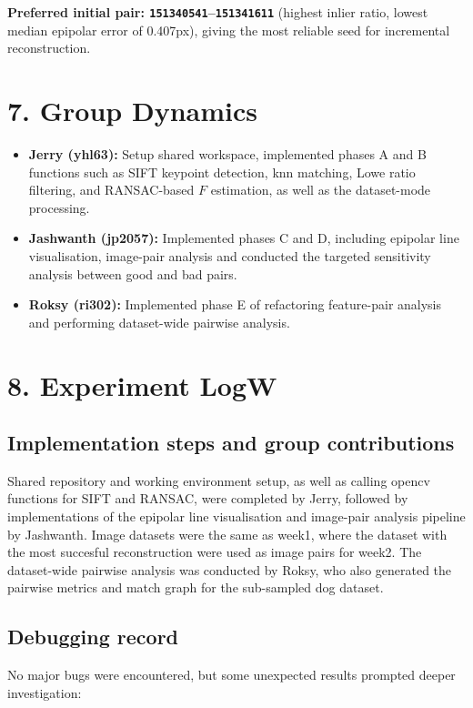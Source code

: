 \documentclass[10pt,a4paper]{article}
\begin{document}
\textbf{Preferred initial pair: \texttt{151340541}--\texttt{151341611}} (highest
inlier ratio, lowest median epipolar error of 0.407px), giving the most
reliable seed for incremental reconstruction.

\section*{7. Group Dynamics}
\vspace{-0.3em}
\begin{itemize}\setlength\itemsep{0pt}
  \item \textbf{Jerry (yhl63):} Setup shared workspace, implemented phases A and B functions such as SIFT keypoint detection, knn matching, Lowe ratio filtering, and RANSAC-based $F$ estimation, as well as the dataset-mode processing.
  \item \textbf{Jashwanth (jp2057):} Implemented phases C and D, including epipolar line visualisation, image-pair analysis and conducted the targeted sensitivity analysis between good and bad pairs.
  \item \textbf{Roksy (ri302):} Implemented phase E of refactoring feature-pair analysis and performing dataset-wide pairwise analysis.
\end{itemize}

\section*{8. Experiment LogW}
\small
\subsection*{Implementation steps and group contributions}

Shared repository and working environment setup, as well as calling opencv functions for SIFT and RANSAC, were completed by Jerry, followed by implementations of the epipolar line visualisation and image-pair analysis pipeline by Jashwanth.
Image datasets were the same as week1, where the dataset with the most succesful reconstruction were used as image pairs for week2. The dataset-wide pairwise analysis was conducted by Roksy, who also generated the pairwise metrics and match graph for the sub-sampled dog dataset.

\subsection*{Debugging record}
No major bugs were encountered, but some unexpected results prompted deeper investigation:
\end{document}
